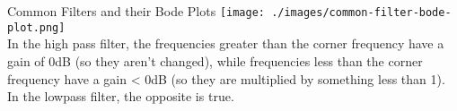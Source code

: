     \begin{frame}{Common Filters and their Bode Plots}
        \texttt{[image: ./images/common-filter-bode-plot.png]}\\
        In the high pass filter, the frequencies greater than the corner frequency have a gain of 0dB (so they aren’t changed), while frequencies less than the corner frequency have a gain < 0dB (so they are multiplied by something less than 1). \\
        In the lowpass filter, the opposite is true.
    \end{frame}

